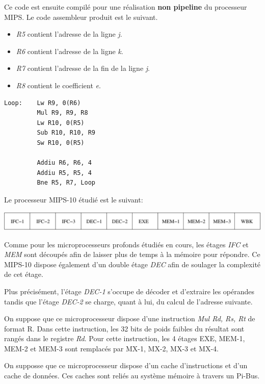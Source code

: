 Ce code est ensuite compil\'e pour une r\'ealisation \textbf{non pipeline}
du processeur MIPS. Le code assembleur produit est le suivant.

\begin{itemize}
  \item
    \textit{R5} contient l'adresse de la ligne \textit{j}.
  \item
    \textit{R6} contient l'adresse de la ligne \textit{k}.
  \item
    \textit{R7} contient l'adresse de la fin de la ligne \textit{j}.
  \item
    \textit{R8} contient le coefficient \textit{e}.
\end{itemize}

\begin{verbatim}
Loop:    Lw R9, 0(R6)
         Mul R9, R9, R8
         Lw R10, 0(R5)
         Sub R10, R10, R9
         Sw R10, 0(R5)

         Addiu R6, R6, 4
         Addiu R5, R5, 4
         Bne R5, R7, Loop
\end{verbatim}

Le processeur MIPS-10 \'etudi\'e est le suivant:

\begin{center}
  \includegraphics[scale=0.6]{figures/pipeline.pdf}
\end{center}

Comme pour les microprocesseurs profonds \'etudi\'es en cours, les \'etages
\textit{IFC} et \textit{MEM} sont d\'ecoup\'es afin de laisser plus de temps
\`a la m\'emoire pour r\'epondre. Ce MIPS-10 dispose \'egalement d'un
double \'etage \textit{DEC} afin de soulager la complexit\'e de cet \'etage.

Plus pr\'ecis\'ement, l'\'etage \textit{DEC-1} s'occupe de d\'ecoder et
d'extraire les op\'erandes tandis que l'\'etage \textit{DEC-2} se charge,
quant \`a lui, du calcul de l'adresse suivante.

On suppose que ce microprocesseur dispose d'une instruction
\textit{Mul Rd, Rs, Rt} de format R. Dans cette instruction, les 32 bits
de poids faibles du r\'esultat sont rang\'es dans le registre \textit{Rd}.
Pour cette instruction, les 4 \'etages EXE, MEM-1, MEM-2 et MEM-3 sont
remplac\'es par MX-1, MX-2, MX-3 et MX-4.

On supposse que ce microprocesseur dispose d'un cache d'instructions et d'un
cache de donn\'ees. Ces caches sont reli\'es au syst\`eme m\'emoire \`a
travers un Pi-Bus.

